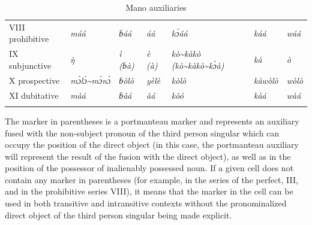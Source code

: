 \documentclass[output=paper,colorlinks,citecolor=brown]{langscibook}
\begin{document}
\begin{table}
\begin{tabularx}{\textwidth}{llllXll}
 VIII prohibitive   &  \textit{máá}              &  \textit{ɓáá}          &  \textit{áá}                                               &  \textit{kɔ́áá}                                                                 &  \textit{káá}              &  \textit{wáá}\\
 IX subjunctive     &   \textit{\`{ŋ}}           &  \textit{ì (ɓà)}       &  \textit{è (à)}                                            &  \textit{kò{\textasciitilde}kàkò} \textit{(kò{\textasciitilde}kàkò{\textasciitilde}kɔ̀à)}  &  \textit{kà}             &  \textit{ò}\\
 X prospective      &  \textit{mɔ̀lɔ̀{\textasciitilde}mɔ̀nɔ̀}  &  \textit{ɓòlò}         &  \textit{yèlè}                                 &  \textit{kòlò}                                                                  & \textit{kàwòlò}           &  \textit{wòlò}\\
 XI dubitative      &  \textit{màá}              &  \textit{ɓàá}            &  \textit{àá}                                             &  \textit{kòó}                                                                   &  \textit{kàá}             &  \textit{wàá}\\
\lspbottomrule
\end{tabularx}
\parbox{\textwidth}{\footnotesize\raggedright The marker in parentheses is a portmanteau marker and represents an auxiliary fused with the non-subject pronoun of the third person singular which can occupy the position of the direct object (in this case, the portmanteau auxiliary will represent the result of the fusion with the direct object), as well as in the position of the possessor of inalienably possessed noun. If a given cell does not contain any marker in parentheses (for example, in the series of the perfect, III, and in the prohibitive series VIII), it means that the marker in the cell can be used in both transitive and intransitive contexts without the pronominalized direct object of the third person singular being made explicit.}
    \caption{Mano auxiliaries}
    \label{tab:mano:app:1}

\end{table}
\end{document}
